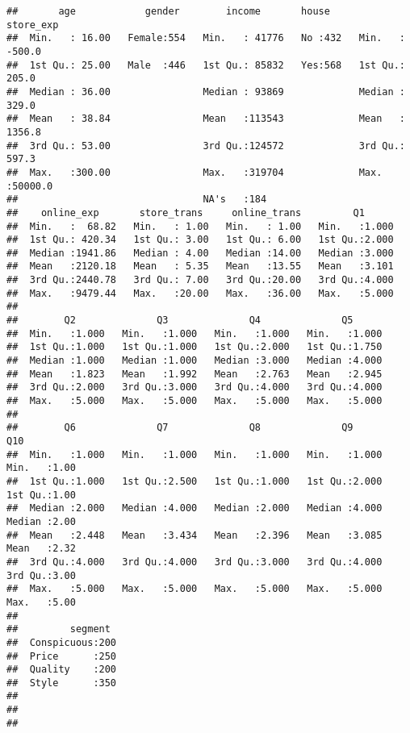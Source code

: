 \documentclass[
]{article}
\begin{document}
\begin{verbatim}
##       age            gender        income       house       store_exp      
##  Min.   : 16.00   Female:554   Min.   : 41776   No :432   Min.   : -500.0  
##  1st Qu.: 25.00   Male  :446   1st Qu.: 85832   Yes:568   1st Qu.:  205.0  
##  Median : 36.00                Median : 93869             Median :  329.0  
##  Mean   : 38.84                Mean   :113543             Mean   : 1356.8  
##  3rd Qu.: 53.00                3rd Qu.:124572             3rd Qu.:  597.3  
##  Max.   :300.00                Max.   :319704             Max.   :50000.0  
##                                NA's   :184                                 
##    online_exp       store_trans     online_trans         Q1       
##  Min.   :  68.82   Min.   : 1.00   Min.   : 1.00   Min.   :1.000  
##  1st Qu.: 420.34   1st Qu.: 3.00   1st Qu.: 6.00   1st Qu.:2.000  
##  Median :1941.86   Median : 4.00   Median :14.00   Median :3.000  
##  Mean   :2120.18   Mean   : 5.35   Mean   :13.55   Mean   :3.101  
##  3rd Qu.:2440.78   3rd Qu.: 7.00   3rd Qu.:20.00   3rd Qu.:4.000  
##  Max.   :9479.44   Max.   :20.00   Max.   :36.00   Max.   :5.000  
##                                                                   
##        Q2              Q3              Q4              Q5       
##  Min.   :1.000   Min.   :1.000   Min.   :1.000   Min.   :1.000  
##  1st Qu.:1.000   1st Qu.:1.000   1st Qu.:2.000   1st Qu.:1.750  
##  Median :1.000   Median :1.000   Median :3.000   Median :4.000  
##  Mean   :1.823   Mean   :1.992   Mean   :2.763   Mean   :2.945  
##  3rd Qu.:2.000   3rd Qu.:3.000   3rd Qu.:4.000   3rd Qu.:4.000  
##  Max.   :5.000   Max.   :5.000   Max.   :5.000   Max.   :5.000  
##                                                                 
##        Q6              Q7              Q8              Q9             Q10      
##  Min.   :1.000   Min.   :1.000   Min.   :1.000   Min.   :1.000   Min.   :1.00  
##  1st Qu.:1.000   1st Qu.:2.500   1st Qu.:1.000   1st Qu.:2.000   1st Qu.:1.00  
##  Median :2.000   Median :4.000   Median :2.000   Median :4.000   Median :2.00  
##  Mean   :2.448   Mean   :3.434   Mean   :2.396   Mean   :3.085   Mean   :2.32  
##  3rd Qu.:4.000   3rd Qu.:4.000   3rd Qu.:3.000   3rd Qu.:4.000   3rd Qu.:3.00  
##  Max.   :5.000   Max.   :5.000   Max.   :5.000   Max.   :5.000   Max.   :5.00  
##                                                                                
##         segment   
##  Conspicuous:200  
##  Price      :250  
##  Quality    :200  
##  Style      :350  
##                   
##                   
## 
\end{verbatim}
\end{document}
